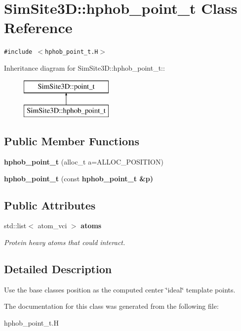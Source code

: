 \section{SimSite3D::hphob\_\-point\_\-t Class Reference}
\label{classSimSite3D_1_1hphob__point__t}
{\tt \#include $<$hphob\_\-point\_\-t.H$>$}

Inheritance diagram for SimSite3D::hphob\_\-point\_\-t::\begin{figure}[H]
\begin{center}
\leavevmode
\includegraphics[height=2cm]{classSimSite3D_1_1hphob__point__t}
\end{center}
\end{figure}
\subsection*{Public Member Functions}
\begin{CompactItemize}
\item 
\textbf{hphob\_\-point\_\-t} (alloc\_\-t a=ALLOC\_\-POSITION)\label{classSimSite3D_1_1hphob__point__t_e907314b41882b3cb7ba2dee30adb580}

\item 
\textbf{hphob\_\-point\_\-t} (const \bf{hphob\_\-point\_\-t} \&p)\label{classSimSite3D_1_1hphob__point__t_d1a8e06a18c252ac60c2c5ed9de1b312}

\end{CompactItemize}
\subsection*{Public Attributes}
\begin{CompactItemize}
\item 
std::list$<$ atom\_\-vci $>$ \bf{atoms}\label{classSimSite3D_1_1hphob__point__t_7e1d90b210cbfb29b6e5fce0cecdd4d8}

\begin{CompactList}\small\item\em Protein heavy atoms that could interact. \item\end{CompactList}\end{CompactItemize}


\subsection{Detailed Description}
Use the base classes position as the computed center \char`\"{}ideal\char`\"{} template points. 



The documentation for this class was generated from the following file:\begin{CompactItemize}
\item 
hphob\_\-point\_\-t.H\end{CompactItemize}
